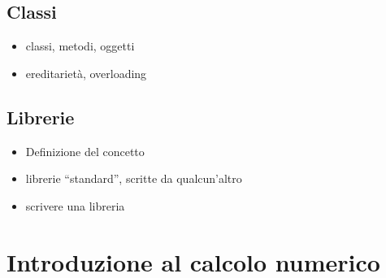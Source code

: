\documentclass[letterpaper,10pt,english]{jupyterBook}
\begin{document}
\chapter{Classi}
\label{\detokenize{ch/programming/oo:classi}}\label{\detokenize{ch/programming/oo::doc}}\begin{itemize}
\item {} 
\sphinxAtStartPar
classi, metodi, oggetti

\item {} 
\sphinxAtStartPar
ereditarietà, overloading

\end{itemize}

\sphinxstepscope


\chapter{Librerie}
\label{\detokenize{ch/programming/libraries:librerie}}\label{\detokenize{ch/programming/libraries::doc}}\begin{itemize}
\item {} 
\sphinxAtStartPar
Definizione del concetto

\item {} 
\sphinxAtStartPar
librerie “standard”, scritte da qualcun’altro

\item {} 
\sphinxAtStartPar
scrivere una libreria

\end{itemize}

\sphinxstepscope


\part{Introduzione al calcolo numerico}

\sphinxstepscope
\end{document}
